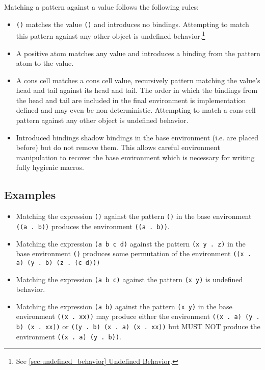 \documentclass[twocolumn]{report}
\newcommand{\intralink}[2]{\hyperref[#1]{\ref*{#1} #2}}
\begin{document}
Matching a pattern against a value follows the following rules:
\begin{itemize}
\item \texttt{()} matches the value \texttt{()} and introduces no bindings.
Attempting to match this pattern against any other object is undefined behavior.\footnote{See \intralink{sec:undefined_behavior}{Undefined Behavior}.}
\item A positive atom matches any value and introduces a binding from the pattern atom to the value.
\item A cons cell matches a cons cell value, recursively pattern matching the value's head and tail against its head and tail.
The order in which the bindings from the head and tail are included in the final environment is implementation defined and may even be non-deterministic.
Attempting to match a cons cell pattern against any other object is undefined behavior.
\item Introduced bindings shadow bindings in the base environment (i.e. are placed before) but do not remove them.
This allows careful environment manipulation to recover the base environment which is necessary for writing fully hygienic macros.
\end{itemize}

\subsection{Examples}
\label{subsec:pattern_matching_examples}

\begin{itemize}
\item Matching the expression \texttt{()} against the pattern \texttt{()} in the base environment \texttt{((a . b))} produces the environment \texttt{((a . b))}.
\item Matching the expression \texttt{(a b c d)} against the pattern \texttt{(x y . z)} in the base environment \texttt{()} produces some permutation of the environment \texttt{((x . a) (y . b) (z . (c d)))}
\item Matching the expression \texttt{(a b c)} against the pattern \texttt{(x y)} is undefined behavior.
\item Matching the expression \texttt{(a b)} against the pattern \texttt{(x y)} in the base environment \texttt{((x . xx))} may produce either the environment \texttt{((x . a) (y . b) (x . xx))} or \texttt{((y . b) (x . a) (x . xx))} but MUST NOT produce the environment \texttt{((x . a) (y . b))}.
\end{itemize}
\end{document}

